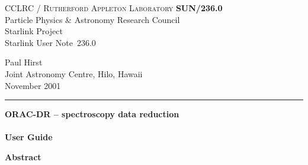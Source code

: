 \documentclass[twoside,11pt]{article}
\newcommand{\stardoccategory}  {Starlink User Note}
\newcommand{\stardocinitials}  {SUN}
\newcommand{\stardocnumber}    {236.0}
\newcommand{\stardocauthors}   {Paul Hirst \\
                                Joint Astronomy Centre, Hilo, Hawaii}
\newcommand{\stardocdate}      {November 2001}
\newcommand{\stardoctitle}     {ORAC-DR -- spectroscopy data reduction}
\newcommand{\stardocversion}   {}
\newcommand{\stardocmanual}    {User Guide}
\newcommand{\stardocname}{\stardocinitials /\stardocnumber}
\newenvironment{latexonly}{}{}
\renewcommand{\_}{\texttt{\symbol{95}}}
\begin{document}
\setcounter{secnumdepth}{5}
\thispagestyle{empty}

\begin{latexonly}
   CCLRC / \textsc{Rutherford Appleton Laboratory} \hfill \textbf{\stardocname}\\
   {\large Particle Physics \& Astronomy Research Council}\\
   {\large Starlink Project\\}
   {\large \stardoccategory\ \stardocnumber}
   \begin{flushright}
   \stardocauthors\\
   \stardocdate
   \end{flushright}
   \vspace{-4mm}
   \rule{\textwidth}{0.5mm}
   \vspace{5mm}
   \begin{center}
   {\Huge\textbf{\stardoctitle \\ [2.5ex]}}
   {\LARGE\textbf{\stardocversion \\ [4ex]}}
   {\Huge\textbf{\stardocmanual}}
   \end{center}
   \vspace{5mm}


   \vspace{10mm}
   \begin{center}
      {\Large\textbf{Abstract}}
   \end{center}
\end{latexonly}
\end{document}
